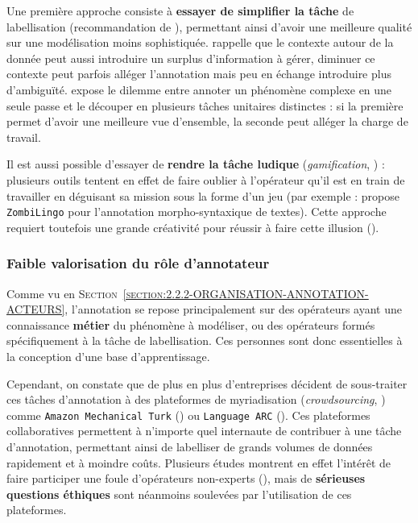 			\begin{leftBarIdea}
				Une première approche consiste à \textbf{essayer de simplifier la tâche} de labellisation (recommandation de \cite{bayerl-paul:2011:what-determines-intercoder}), permettant ainsi d'avoir une meilleure qualité sur une modélisation moins sophistiquée.
				\cite{fort-etal:2012:modeling-complexity-manual} rappelle que le contexte autour de la donnée peut aussi introduire un surplus d'information à gérer, diminuer ce contexte peut parfois alléger l'annotation mais peu en échange introduire plus d'ambiguïté.
				\cite{baledent:2022:complexite-annotation-manuelle} expose le dilemme entre annoter un phénomène complexe en une seule passe et le découper en plusieurs tâches unitaires distinctes : si la première permet d'avoir une meilleure vue d'ensemble, la seconde peut alléger la charge de travail.
				
				Il est aussi possible d'essayer de \textbf{rendre la tâche ludique} (\textit{gamification}, \cite{von-ahn:2006:games-purpose}) : plusieurs outils tentent en effet de faire oublier à l'opérateur qu'il est en train de travailler en déguisant sa mission sous la forme d'un jeu (par exemple : \cite{guillaume-etal:2016:crowdsourcing-complex-language} propose \texttt{ZombiLingo} pour l'annotation morpho-syntaxique de textes).
				Cette approche requiert toutefois une grande créativité pour réussir à faire cette illusion (\cite{fort:2017:experts-ou-foule}).
			\end{leftBarIdea}
		
		
		\subsubsection{Faible valorisation du rôle d'annotateur}
		\label{section:2.3.3.C-DEFIS-ANNOTATION-ASPECT-HUMAIN-ESCLAVAGE}
			
			Comme vu en \textsc{Section~\ref{section:2.2.2-ORGANISATION-ANNOTATION-ACTEURS}}, l'annotation se repose principalement sur des opérateurs ayant une connaissance \textbf{métier} du phénomène à modéliser, ou des opérateurs formés spécifiquement à la tâche de labellisation.
			Ces personnes sont donc essentielles à la conception d'une base d'apprentissage.
			
			Cependant, on constate que de plus en plus d'entreprises décident de sous-traiter ces tâches d'annotation à des plateformes de myriadisation (\textit{crowdsourcing}, \cite{howe:2008:crowdsourcing-how-power}) comme \texttt{Amazon Mechanical Turk} (\cite{callison-burch-dredze:2010:creating-speech-language}) ou \texttt{Language ARC} (\cite{fiumara-etal:2020:languagearc-developing-language}).
			Ces plateformes collaboratives permettent à n'importe quel internaute de contribuer à une tâche d'annotation, permettant ainsi de labelliser de grands volumes de données rapidement et à moindre coûts.
			Plusieurs études montrent en effet l'intérêt de faire participer une foule d'opérateurs non-experts (\cite{snow-etal:2008:cheap-fast-it}), mais de \textbf{sérieuses questions éthiques} sont néanmoins soulevées par l'utilisation de ces plateformes.
			
